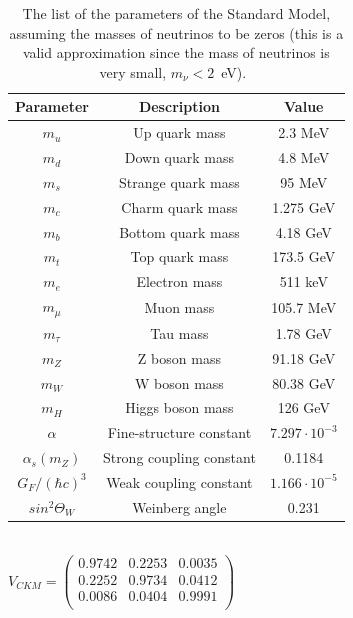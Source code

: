 \begin{table}[ht!]
\centering
\begin{tabular}{c|c|c} \hline\hline
Parameter & Description & Value \\\hline

$m_{u}$ & Up quark mass &  2.3 MeV \\
$m_{d}$ & Down quark mass & 4.8 MeV \\
$m_{s}$ & Strange quark mass & 95 MeV \\
$m_{c}$ & Charm quark mass & 1.275 GeV \\
$m_{b}$ & Bottom quark mass & 4.18 GeV \\
$m_{t}$ & Top quark mass & 173.5 GeV \\
\hline
$m_{e}$ & Electron mass & 511 keV \\
$m_{\mu}$ & Muon mass & 105.7 MeV \\
$m_{\tau}$ & Tau mass & 1.78 GeV \\
\hline
$m_{Z}$ & Z boson mass & 91.18 GeV \\
$m_{W}$ & W boson mass & 80.38 GeV \\
$m_{H}$ & Higgs boson mass & 126 GeV \\
\hline
$\alpha$ & Fine-structure constant & $7.297 \cdot 10^{-3}$\\
$\alpha_{s}(m_Z)$ & Strong coupling constant & 0.1184\\
$G_{F}/(\hbar c)^3$ & Weak coupling constant & $1.166 \cdot 10^{-5}$ \\
\hline
$sin^{2} \Theta_{W}$ & Weinberg angle & 0.231 \\
\hline\hline
\end{tabular}
\\[2ex]
$V_{CKM} = \left(\begin{array}{ccc}
0.9742 & 0.2253 & 0.0035 \\
0.2252 & 0.9734 & 0.0412 \\
0.0086 & 0.0404 & 0.9991 \\
\end{array}\right)$
\caption{The list of the parameters of the Standard Model, assuming the masses of neutrinos to be zeros (this is a valid approximation since the mass of neutrinos is very small, $m_\nu < 2$~eV).~\cite{lib:PDG}}
\label{tab:SM_parameters}
\end{table}

